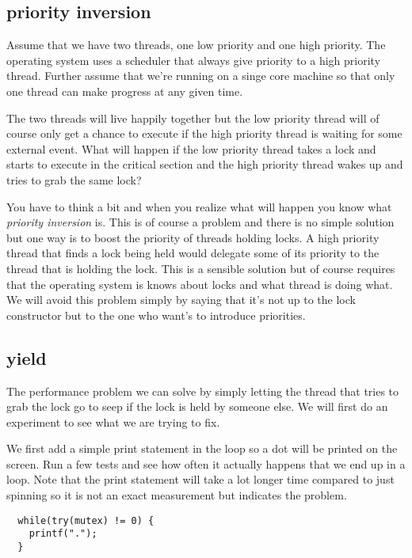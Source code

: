 \documentclass[a4paper,11pt]{article}
\begin{document}
\subsection{priority inversion}

Assume that we have two threads, one low priority and one high
priority. The operating system uses a scheduler that always give
priority to a high priority thread. Further assume that we're running
on a singe core machine so that only one thread can make progress at
any given time.

The two threads will live happily together but the low priority thread
will of course only get a chance to execute if the high priority
thread is waiting for some external event. What will happen if the low
priority thread takes a lock and starts to execute in the critical
section and the high priority thread wakes up and tries to grab the
same lock?

You have to think a bit and when you realize what will happen you know
what {\em priority inversion} is. This is of course a problem and
there is no simple solution but one way is to boost the priority of
threads holding locks. A high priority thread that finds a lock being
held would delegate some of its priority to the thread that is holding
the lock. This is a sensible solution but of course requires that the
operating system is knows about locks and what thread is doing
what. We will avoid this problem simply by saying that it's not up to
the lock constructor but to the one who want's to introduce priorities.

\subsection{yield}

The performance problem we can solve by simply letting the thread that
tries to grab the lock go to seep if the lock is held by someone
else. We will first do an experiment to see what we are trying to fix.

We first add a simple print statement in the loop so a dot will be
printed on the screen. Run a few tests and see how often it actually
happens that we end up in a loop. Note that the print statement will
take a lot longer time compared to just spinning so it is not an exact
measurement but indicates the problem.

\begin{lstlisting}
  while(try(mutex) != 0) {
    printf("."); 
  }
\end{lstlisting}
\end{document}
